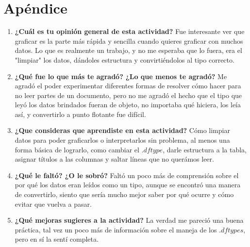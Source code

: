 \documentclass{article}
\begin{document}
\section{Apéndice}
\begin{enumerate}
\item \textbf{¿Cuál es tu opinión general de esta actividad?}
Fue interesante ver que graficar es la parte más rápida y sencilla cuando quieres graficar con muchos datos. Lo que es realmente un trabajo, y no me esperaba que lo fuera, era el "limpiar" los datos, dándoles estructura y convirtiéndolos al tipo correcto.
\item \textbf{¿Qué fue lo que más te agradó? ¿Lo que menos te agradó?} Me agradó el poder experimentar diferentes formas de resolver cómo hacer para no leer partes de un documento, pero no me agradó el hecho que el tipo que leyó los datos brindados fueran de objeto, no importaba qué hiciera, los leía así, y convertirlo a punto flotante fue difícil.
\item \textbf{¿Que consideras que aprendiste en esta actividad?} Cómo limpiar datos para poder graficarlos o interpretarlos sin problema, al menos una forma básica de lograrlo, como cambiar el $.dftype$, darle estructura a la tabla, asignar títulos a las columnas y saltar líneas que no querámos leer.
\item \textbf{¿Qué le faltó? ¿O le sobró?} Faltó un poco más de comprensión sobre el por qué los datos eran leídos como un tipo, aunque se encontró una manera de convertirlo, siento que sería mucho mejor saber por qué ocurre y cómo evitar que vuelva a pasar.
\item \textbf{¿Qué mejoras sugieres a la actividad?} La verdad me pareció una buena práctica, tal vez un poco más de información sobre el maneja de los $.dftypes$, pero en sí la sentí completa.
\end{enumerate}
\end{document}
